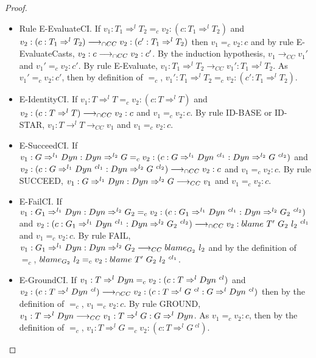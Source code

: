 \documentclass[a4paper]{article}
\begin{document}
\begin{proof}
\begin{itemize}
\begin{itemize}
\begin{itemize}
            \item Rule E-EvaluateCI.
            If $v_1 : T_1 \Rightarrow^l T_2 =_c v_2 : (c : T_1 \Rightarrow^l T_2)$ and $v_2 : (c : T_1 \Rightarrow^l T_2) \longrightarrow_{\cap CC} v_2 : (c' : T_1 \Rightarrow^l T_2)$ then $v_1 =_c v_2 : c$ and by rule E-EvaluateCasts, $v_2 : c \longrightarrow_{\cap CC} v_2 : c'$.
            By the induction hypothesis, $v_1 \longrightarrow_{CC} v_1'$ and $v_1' =_c v_2 : c'$.
            By rule E-Evaluate, $v_1 : T_1 \Rightarrow^l T_2 \longrightarrow_{CC} v_1' : T_1 \Rightarrow^l T_2$.
            As $v_1' =_c v_2 : c'$, then by definition of $=_c$, $v_1' : T_1 \Rightarrow^l T_2 =_c v_2 : (c' : T_1 \Rightarrow^l T_2)$.
            \item E-IdentityCI.
            If $v_1 : T \Rightarrow^l T =_c v_2 : (c : T \Rightarrow^l T)$ and $v_2 : (c : T \Rightarrow^l T) \longrightarrow_{\cap CC} v_2 : c$ and $v_1 =_c v_2 : c$.
            By rule ID-BASE or ID-STAR, $v_1 : T \rightarrow^l T \longrightarrow_{CC} v_1$ and $v_1 =_c v_2 : c$.
            \item E-SucceedCI.
            If $v_1 : G \Rightarrow^{l_1} \Dyn : \Dyn \Rightarrow^{l_2} G =_c v_2 : (c : G \Rightarrow^{l_1} \Dyn\ ^{cl_1} : \Dyn \Rightarrow^{l_2} G\ ^{cl_2})$ and $v_2 : (c : G \Rightarrow^{l_1} Dyn\ ^{cl_1} : Dyn \Rightarrow^{l_2} G\ ^{cl_2}) \longrightarrow_{\cap CC} v_2 : c$ and $v_1 =_c v_2 : c$.
            By rule SUCCEED, $v_1 : G \Rightarrow^{l_1} Dyn : Dyn \Rightarrow^{l_2} G \longrightarrow_{CC} v_1$ and $v_1 =_c v_2 : c$.
            \item E-FailCI.
            If $v_1 : G_1 \Rightarrow^{l_1} \Dyn : \Dyn \Rightarrow^{l_2} G_2 =_c v_2 : (c : G_1 \Rightarrow^{l_1} \Dyn\ ^{cl_1} : \Dyn \Rightarrow^{l_2} G_2\ ^{cl_2})$ and $v_2 : (c : G_1 \Rightarrow^{l_1} Dyn\ ^{cl_1} : Dyn \Rightarrow^{l_2} G_2\ ^{cl_2}) \longrightarrow_{\cap CC} v_2 : blame\ T'\ G_2\ l_2\ ^{cl_1}$ and $v_1 =_c v_2 : c$.
            By rule FAIL, $v_1 : G_1 \Rightarrow^{l_1} Dyn : Dyn \Rightarrow^{l_2} G_2 \longrightarrow_{CC} blame_{G_2}\ l_2$ and by the definition of $=_c$, $blame_{G_2}\ l_2 =_c v_2 : blame\ T'\ G_2\ l_2\ ^{cl_1}$.
            \item E-GroundCI.
            If $v_1 : T \Rightarrow^l Dyn =_c v_2 : (c : T \Rightarrow^l Dyn\ ^{cl})$ and $v_2 : (c : T \Rightarrow^l Dyn\ ^{cl}) \longrightarrow_{\cap CC} v_2 : (c : T \Rightarrow^l G\ ^{cl} : G \Rightarrow^l Dyn\ ^{cl})$ then by the definition of $=_c$, $v_1 =_c v_2 : c$.
            By rule GROUND, $v_1 : T \Rightarrow^l Dyn \longrightarrow_{CC} v_1 : T \Rightarrow^l G : G \Rightarrow^l Dyn$.
            As $v_1 =_c v_2 : c$, then by the definition of $=_c$, $v_1 : T \Rightarrow^l G =_c v_2 : (c : T \Rightarrow^l G\ ^{cl})$.

\end{itemize}
\end{itemize}
\end{itemize}
\end{proof}
\end{document}
